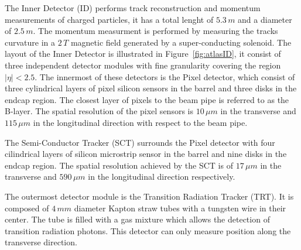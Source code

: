 The Inner Detector (ID) performs track reconstruction  and momentum measurements of charged particles, it has a total lenght of $5.3\,m$ and a diameter of $2.5\,m$.
The momentum measurment is performed by measuring the tracks curvature in a $2\,T$ magnetic field generated by 
a super-conducting solenoid. The layout of the Inner Detector is illustrated in Figure~\ref{fig:atlasID},
it consist of three independent detector modules with fine granularity
covering the region $|\eta| < 2.5$. The innermost of these detectors is the Pixel detector,
which consist of three cylindrical layers of pixel silicon sensors in the barrel and three disks in the endcap region. The closest layer of pixels to the beam pipe is
referred to as the B-layer. The spatial resolution of the pixel sensors is $10\,\mu m$ in the transverse and $115\,\mu m$ in the longitudinal
direction with respect to the beam pipe.

The Semi-Conductor Tracker (SCT) surrounds the Pixel detector with four cilindrical layers of silicon microstrip sensor in the barrel
and nine disks in the  endcap region. The spatial resolution achieved by the SCT is of $17\,\mu m$ in the transverse and $590\,\mu m$ in the longitudinal direction 
respectively.

The outermost detector module is the Transition Radiation Tracker (TRT). It is composed of $4\,mm$ diameter Kapton straw tubes
with a tungsten wire in their center. The tube is filled with a gas mixture which allows the detection of transition 
radiation photons. This detector can only measure position along the transverse direction.





